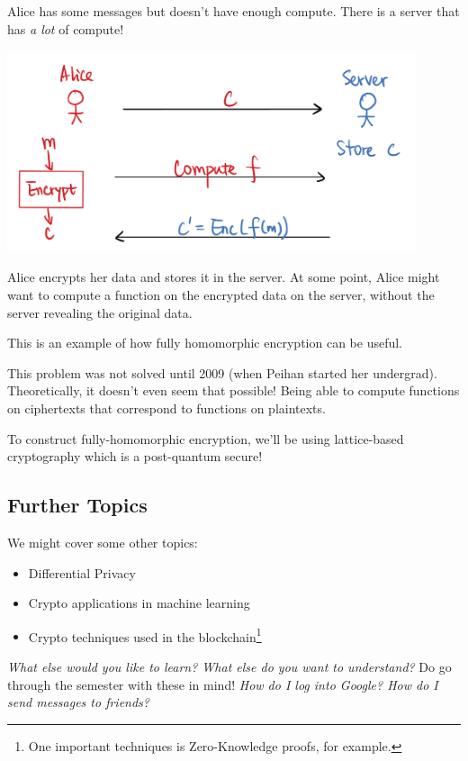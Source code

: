 \begin{example*}
    Alice has some messages but doesn't have enough compute. There is a server that has \emph{a lot} of compute!

    \begin{center}
        \includegraphics[width=0.9\textwidth]{images/2023-01-26/outsourced_computation.png}
    \end{center}

    Alice encrypts her data and stores it in the server. At some point, Alice might want to compute a function on the encrypted data on the server, without the server revealing the original data.

    This is an example of how fully homomorphic encryption can be useful.
\end{example*}

\begin{remark*}
    This problem was not solved until 2009 (when Peihan started her undergrad). Theoretically, it doesn't even seem that possible! Being able to compute functions on ciphertexts that correspond to functions on plaintexts.
\end{remark*}

To construct fully-homomorphic encryption, we'll be using lattice-based cryptography which is a post-quantum secure!

\subsection{Further Topics}
We might cover some other topics:
\begin{itemize}
    \item Differential Privacy
    \item Crypto applications in machine learning
    \item Crypto techniques used in the blockchain\footnote{One important techniques is Zero-Knowledge proofs, for example.}
\end{itemize}
\emph{What else would you like to learn? What else do you want to understand?} Do go through the semester with these in mind! \emph{How do I log into Google? How do I send messages to friends?}

